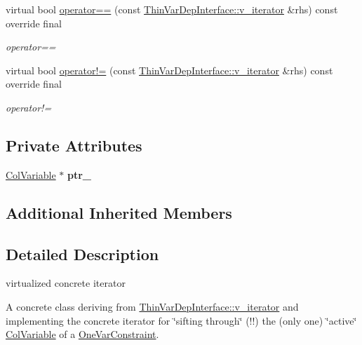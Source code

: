 \begin{DoxyCompactItemize}
virtual bool \mbox{\hyperlink{class_s_m_spp__di__unipi__it_1_1_one_var_constraint_1_1v__iterator_a0dc0c588cd40c35cea17618336da30c3}{operator==}} (const \mbox{\hyperlink{class_s_m_spp__di__unipi__it_1_1_thin_var_dep_interface_1_1v__iterator}{Thin\+Var\+Dep\+Interface\+::v\+\_\+iterator}} \&rhs) const override final
\begin{DoxyCompactList}\small\item\em operator== \end{DoxyCompactList}\item 
\mbox{\label{class_s_m_spp__di__unipi__it_1_1_one_var_constraint_1_1v__iterator_a4ef887954a2c32df7152f23942ff2882}} 
virtual bool \mbox{\hyperlink{class_s_m_spp__di__unipi__it_1_1_one_var_constraint_1_1v__iterator_a4ef887954a2c32df7152f23942ff2882}{operator!=}} (const \mbox{\hyperlink{class_s_m_spp__di__unipi__it_1_1_thin_var_dep_interface_1_1v__iterator}{Thin\+Var\+Dep\+Interface\+::v\+\_\+iterator}} \&rhs) const override final
\begin{DoxyCompactList}\small\item\em operator!= \end{DoxyCompactList}\end{DoxyCompactItemize}
\subsection*{Private Attributes}
\begin{DoxyCompactItemize}
\item 
\mbox{\label{class_s_m_spp__di__unipi__it_1_1_one_var_constraint_1_1v__iterator_a2534d8407d94833f3a508b7e67ed14ee}} 
\mbox{\hyperlink{class_s_m_spp__di__unipi__it_1_1_col_variable}{Col\+Variable}} $\ast$ {\bfseries ptr\+\_\+}
\end{DoxyCompactItemize}
\subsection*{Additional Inherited Members}


\subsection{Detailed Description}
virtualized concrete iterator 

A concrete class deriving from \mbox{\hyperlink{class_s_m_spp__di__unipi__it_1_1_thin_var_dep_interface_1_1v__iterator}{Thin\+Var\+Dep\+Interface\+::v\+\_\+iterator}} and implementing the concrete iterator for \char`\"{}sifting through\char`\"{} (!!) the (only one) \char`\"{}active\char`\"{} \mbox{\hyperlink{class_s_m_spp__di__unipi__it_1_1_col_variable}{Col\+Variable}} of a \mbox{\hyperlink{class_s_m_spp__di__unipi__it_1_1_one_var_constraint}{One\+Var\+Constraint}}. 

